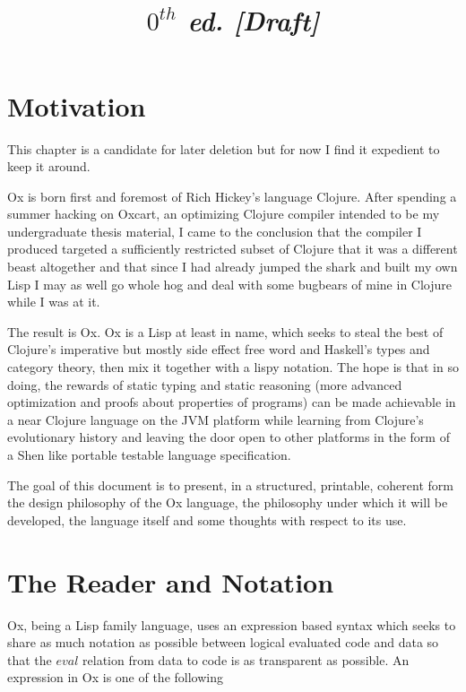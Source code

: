 \documentclass{report}
\title{
  \vspace{2in}
  \textmd{\textbf{\Title}}\\
  \vspace{0.1in}\large{\textit{$0^{th}$ ed. [Draft]}}
  \vspace{3in}
}
\author{\textbf{\AuthorName}}
\date{}
\begin{document}
\maketitle


\newpage
\tableofcontents
\newpage

\chapter{Motivation}

This chapter is a candidate for later deletion but for now I find it expedient
to keep it around.

Ox is born first and foremost of Rich Hickey's language Clojure. After spending
a summer hacking on Oxcart, an optimizing Clojure compiler intended to be my
undergraduate thesis material, I came to the conclusion that the compiler I
produced targeted a sufficiently restricted subset of Clojure that it was a
different beast altogether and that since I had already jumped the shark and
built my own Lisp I may as well go whole hog and deal with some bugbears of mine
in Clojure while I was at it.

The result is Ox. Ox is a Lisp at least in name, which seeks to steal the best
of Clojure's imperative but mostly side effect free word and Haskell's types and
category theory, then mix it together with a lispy notation. The hope is that in
so doing, the rewards of static typing and static reasoning (more advanced
optimization and proofs about properties of programs) can be made achievable in
a near Clojure language on the JVM platform while learning from Clojure's
evolutionary history and leaving the door open to other platforms in the form of
a Shen like portable testable language specification.

The goal of this document is to present, in a structured, printable, coherent
form the design philosophy of the Ox language, the philosophy under which it
will be developed, the language itself and some thoughts with respect to its
use.

\chapter{The Reader and Notation}


Ox, being a Lisp family language, uses an expression based syntax which seeks to
share as much notation as possible between logical evaluated code and data so
that the $eval$ relation from data to code is as transparent as possible. An
expression in Ox is one of the following
\end{document}
